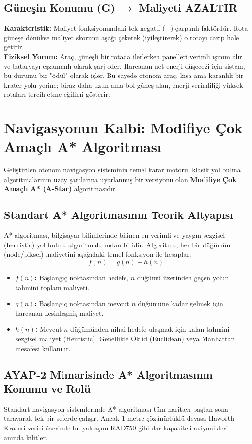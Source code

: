 \documentclass[12pt,a4paper]{article}
\begin{document}
\subsection{Güneşin Konumu (G) $\rightarrow$ Maliyeti AZALTIR}
\textbf{Karakteristik:} Maliyet fonksiyonundaki tek negatif ($-$) çarpanlı faktördür. Rota güneşe dönükse maliyet skorunu aşağı çekerek (iyileştirerek) o rotayı cazip hale getirir. \\
\textbf{Fiziksel Yorum:} Araç, güneşli bir rotada ilerlerken panelleri verimli ışınım alır ve bataryayı eşzamanlı olarak şarj eder. Harcanan net enerji düşeceği için sistem, bu durumu bir "ödül" olarak işler. Bu sayede otonom araç, kısa ama karanlık bir krater yolu yerine; biraz daha uzun ama bol güneş alan, enerji verimliliği yüksek rotaları tercih etme eğilimi gösterir.

\newpage
\section{Navigasyonun Kalbi: Modifiye Çok Amaçlı A* Algoritması}
Geliştirilen otonom navigasyon sisteminin temel karar motoru, klasik yol bulma algoritmalarının uzay şartlarına uyarlanmış bir versiyonu olan \textbf{Modifiye Çok Amaçlı A* (A-Star)} algoritmasıdır.

\subsection{Standart A* Algoritmasının Teorik Altyapısı}
A* algoritması, bilgisayar bilimlerinde bilinen en verimli ve yaygın sezgisel (heuristic) yol bulma algoritmalarından biridir. Algoritma, her bir düğümün (node/piksel) maliyetini aşağıdaki temel fonksiyon ile hesaplar:
\begin{equation}
f(n) = g(n) + h(n)
\end{equation}
\begin{itemize}
    \item \textbf{$f(n)$:} Başlangıç noktasından hedefe, $n$ düğümü üzerinden geçen yolun tahmini toplam maliyeti.
    \item \textbf{$g(n)$:} Başlangıç noktasından mevcut $n$ düğümüne kadar gelmek için harcanan kesinleşmiş maliyet.
    \item \textbf{$h(n)$:} Mevcut $n$ düğümünden nihai hedefe ulaşmak için kalan tahmini sezgisel maliyet (Heuristic). Genellikle Öklid (Euclidean) veya Manhattan mesafesi kullanılır.
\end{itemize}

\subsection{AYAP-2 Mimarisinde A* Algoritmasının Konumu ve Rolü}
Standart navigasyon sistemlerinde A* algoritması tüm haritayı baştan sona tarayarak tek bir seferde çalışır. Ancak 1 metre çözünürlüklü devasa Haworth Krateri verisi üzerinde bu yaklaşım RAD750 gibi dar kapasiteli aviyonikleri anında kilitler.
\end{document}

